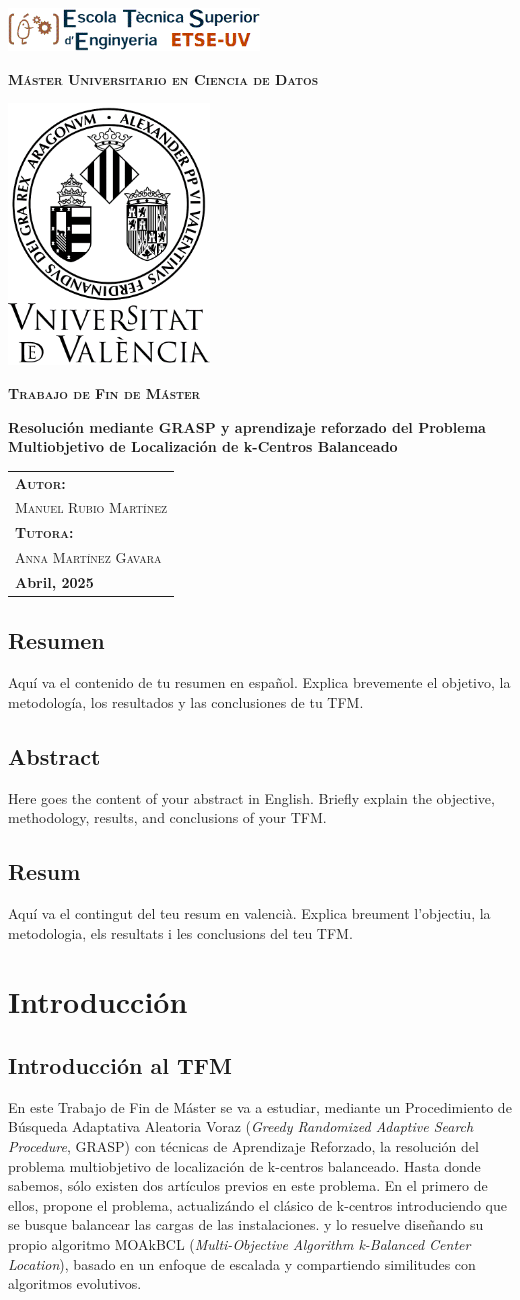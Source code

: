\documentclass[12pt,a4paper]{book}
\newcommand{\nuevaportada}[6]{
    \thispagestyle{empty}
    \begin{center}
        \includegraphics[width=0.5\textwidth]{images/logo.png}
        
        \vspace{0.3cm} %
        {\Large\bfseries\textsc{M\'aster Universitario en #1}\par}
        
        \vspace{0.3cm} %
        \includegraphics[width=0.4\textwidth]{images/uv.png}
        
        \vspace{0.3cm} %
        {\Large\bfseries\textsc{Trabajo de Fin de M\'aster}\par}
        
        \vspace{0.5cm} %
        {\Large\bfseries #2\par}
        
        \vspace{1.5cm} %
        \begin{flushright}
            \begin{tabular}{l} 
                {\large\bfseries\textsc{Autor:}} \\
                {\large\textsc{#3}} \\ [0.3cm] %
                {\large\bfseries\textsc{Tutora:}} \\ 
                {\large\textsc{#4}} \\ [0.3cm] %
                {\large\bfseries #5} 
            \end{tabular}
        \end{flushright}
    \end{center}
}
\begin{document}
\nuevaportada{Ciencia de Datos}{Resolución mediante GRASP y aprendizaje reforzado del Problema Multiobjetivo de Localización de k-Centros Balanceado }{Manuel Rubio Martínez}{Anna Martínez Gavara}{Abril, 2025}

\clearpage

\newpage
\tableofcontents

\newpage

\section*{Resumen}
Aquí va el contenido de tu resumen en español. Explica brevemente el objetivo, la metodología, los resultados y las conclusiones de tu TFM.

\newpage

\section*{Abstract}
Here goes the content of your abstract in English. Briefly explain the objective, methodology, results, and conclusions of your TFM.

\newpage

\section*{Resum}
Aquí va el contingut del teu resum en valencià. Explica breument l'objectiu, la metodologia, els resultats i les conclusions del teu TFM.

\newpage

\chapter{Introducción}

\section{Introducción al TFM}
En este Trabajo de Fin de Máster se va a estudiar, mediante un Procedimiento de Búsqueda Adaptativa Aleatoria Voraz (\textit{Greedy Randomized Adaptive Search Procedure}, GRASP) con técnicas de Aprendizaje Reforzado, la resolución del problema multiobjetivo de localización de k-centros balanceado.
Hasta donde sabemos, sólo existen dos artículos previos en este problema. En el primero de ellos, \citet{k-balanced_1} propone el problema, actualizándo el clásico de k-centros introduciendo que se busque balancear las cargas de las instalaciones.
y lo resuelve diseñando su propio algoritmo MOAkBCL (\textit{Multi-Objective Algorithm k-Balanced Center Location}), basado en un enfoque de escalada y compartiendo similitudes con algoritmos evolutivos.
\end{document}
